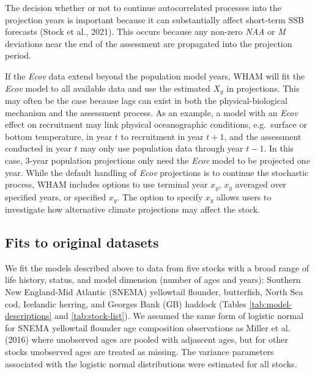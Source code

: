 \documentclass[]{article}
\begin{document}
The decision whether or not to continue autocorrelated processes into
the projection years is important because it can substantially affect
short-term SSB forecasts (Stock et al., 2021). This occurs because any
non-zero \emph{NAA} or \emph{M} deviations near the end of the
assessment are propagated into the projection period.

If the \emph{Ecov} data extend beyond the population model years, WHAM
will fit the \emph{Ecov} model to all available data and use the
estimated \(X_y\) in projections. This may often be the case because
lags can exist in both the physical-biological mechanism and the
assessment process. As an example, a model with an \emph{Ecov} effect on
recruitment may link physical oceanographic conditions, e.g.~surface or
bottom temperature, in year \(t\) to recruitment in year \(t+1\), and
the assessment conducted in year \(t\) may only use population data
through year \(t-1\). In this case, 3-year population projections only
need the \emph{Ecov} model to be projected one year. While the default
handling of \emph{Ecov} projections is to continue the stochastic
process, WHAM includes options to use terminal year \(x_y\), \(x_y\)
averaged over specified years, or specified \(x_y\). The option to
specify \(x_y\) allows users to investigate how alternative climate
projections may affect the stock.

\hypertarget{fits-to-original-datasets}{%
\subsection{Fits to original datasets}\label{fits-to-original-datasets}}

We fit the models described above to data from five stocks with a broad
range of life history, status, and model dimension (number of ages and
years): Southern New England-Mid Atlantic (SNEMA) yellowtail flounder,
butterfish, North Sea cod, Icelandic herring, and Georges Bank (GB)
haddock (Tables \ref{tab:model-descriptions} and \ref{tab:stock-list}).
We assumed the same form of logistic normal for SNEMA yellowtail
flounder age composition observations as Miller et al. (2016) where
unobserved ages are pooled with adjascent ages, but for other stocks
unobserved ages are treated as missing. The variance parameters
associated with the logistic normal distributions were estimated for all
stocks.
\end{document}
